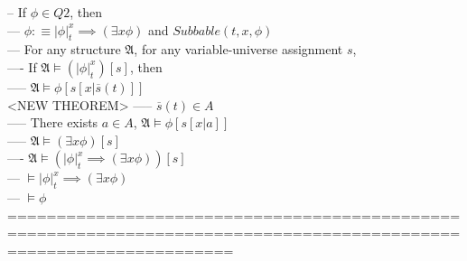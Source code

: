 \documentclass{book}
\newcommand{\is}{:\equiv}
\newcommand{\extend}[1]{\overline{#1}}
\newcommand{\sub}[3]{\left|#1\right|_{#3}^{#2}}
\begin{document}
		-- If $\phi \in Q2$, then \\
			--- $\phi \is \sub{\phi}{x}{t} \implies (\exists x \phi)$ and $Subbable(t, x, \phi)$ \\
			--- For any structure $\mathfrak{A}$, for any variable-universe assignment $s$, \\
				---- If $\mathfrak{A} \vDash (\sub{\phi}{x}{t})[s]$, then \\
					----- $\mathfrak{A} \vDash \phi[s[x|\extend{s}(t)]]$ \\ <NEW THEOREM>
					----- $\extend{s}(t) \in A$ \\
					----- There exists $a \in A$, $\mathfrak{A} \vDash \phi[s[x|a]]$ \\
					----- $\mathfrak{A} \vDash (\exists x \phi)[s]$ \\
				---- $\mathfrak{A} \vDash (\sub{\phi}{x}{t} \implies (\exists x \phi))[s]$ \\
			--- $\vDash \sub{\phi}{x}{t} \implies (\exists x \phi)$ \\
			--- $\vDash \phi$ \\
	===================================================================================================================
\end{document}
